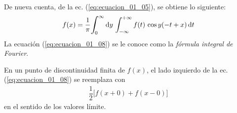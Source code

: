 De nueva cuenta, de la ec. (\ref{eq:ecuacion_01_05}), se obtiene lo siguiente:
\begin{align}
f(x) = \dfrac{1}{\pi} \scaleint{6ex}_{\bs 0}^{\infty}  \dd{y} \, \int_{-\infty}^{+\infty} f(t) \, \cos y(-t + x) \dd{t} \label{eq:ecuacion_01_08}
\end{align}
La ecuación (\ref{eq:ecuacion_01_08}) se le conoce como la \emph{fórmula integral de Fourier}.
\par
En un punto de discontinuidad finita de $f(x)$, el lado izquierdo de la ec. (\ref{eq:ecuacion_01_08}) se reemplaza con
\begin{align*}
\dfrac{1}{2} \big[ f(x + 0) + f(x - 0) \big]
\end{align*}
en el sentido de los valores límite.

